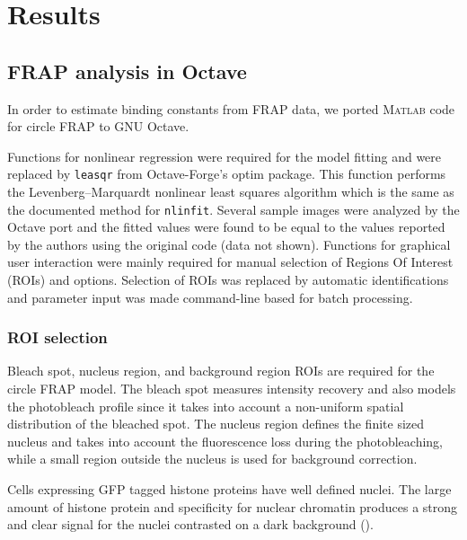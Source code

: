 \section{Results}

  \subsection{FRAP analysis in Octave}

    In order to estimate binding constants from FRAP data, we ported 
	\textsc{Matlab} code for circle FRAP \citep{mueller2008evidence} to GNU Octave.

    Functions for nonlinear regression were required for the model
    fitting and were replaced by \texttt{leasqr}
    from Octave-Forge's optim package. This function performs the
    Levenberg--Marquardt nonlinear least squares algorithm which is the
    same as the documented method for \texttt{nlinfit}.
    Several sample images were analyzed
    by the Octave port and the fitted values were found to be equal to
    the values reported by the authors using the original code (data not shown). 
	Functions for graphical user interaction were mainly required
    for manual selection of Regions Of Interest (ROIs) and options. 
    Selection of ROIs was replaced by automatic identifications 
	and parameter input was made command-line based for batch processing.

    \subsubsection{ROI selection}

      Bleach spot, nucleus region, and background region ROIs are required 
	  for the circle FRAP model. The bleach spot measures intensity recovery 
      and also models the photobleach profile since it takes into account
      a non-uniform spatial distribution of the bleached spot. The nucleus
      region defines the finite sized nucleus and takes into account 
	  the fluorescence loss during the photobleaching, 
	  while a small region outside the nucleus is used for background correction.

      Cells expressing GFP tagged histone proteins have well defined nuclei. 
	  The large amount of histone protein and specificity for nuclear chromatin 
	  produces a strong and clear signal for the nuclei contrasted on a dark background ().

